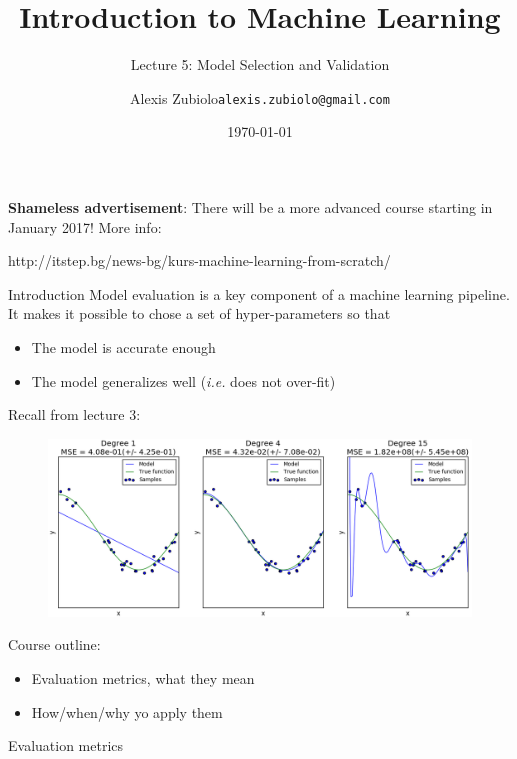 \documentclass{beamer}
\title[Classification]{Introduction to Machine Learning}
\subtitle{Lecture 5: Model Selection and Validation}
\author{Alexis Zubiolo\newline\texttt{alexis.zubiolo@gmail.com}}
\institute{Data Science Team Lead @ Adcash}
\date{\today}
\newcommand{\1}[1]{\mathbbm{1}\left[#1\right]}
\begin{document}
\begin{frame}
  \titlepage
\end{frame}

\begin{frame}
\textbf{Shameless advertisement}: There will be a more advanced course starting in January 2017!
\vfill
More info:
\begin{center}
http://itstep.bg/news-bg/kurs-machine-learning-from-scratch/
\end{center}
\end{frame}

\begin{frame}{Introduction}
Model evaluation is a key component of a machine learning pipeline.
\pause
\vfill
It makes it possible to chose a set of hyper-parameters so that
\begin{itemize}
	\item The model is accurate enough
	\item The model generalizes well (\textit{i.e.} does not over-fit)
\end{itemize}
\vfill
\pause
Recall from lecture 3:
\begin{figure}
\centering
\includegraphics[width=\textwidth]{images/over_under_fitting.png}
\end{figure}
\end{frame}

\begin{frame}
Course outline:
\begin{itemize}
	\item Evaluation metrics, what they mean
	\item How/when/why yo apply them
\end{itemize}
\end{frame}

\begin{frame}
\begin{center}
\Huge{Evaluation metrics}
\end{center}
\end{frame}
\end{document}
